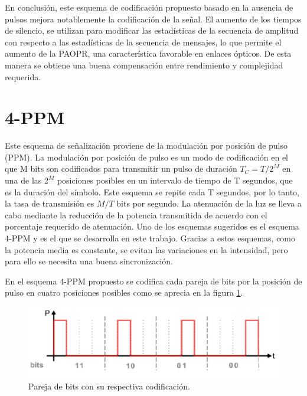 En conclusión, este esquema de codificación propuesto basado en la ausencia de pulsos
mejora notablemente la codificación de la señal.
El aumento de los tiempos de silencio, se utilizan para modificar las estadísticas de
la secuencia de amplitud con respecto a las estadísticas de la
secuencia de mensajes, lo que permite el aumento de la PAOPR,
una característica favorable en enlaces ópticos. De esta manera se 
obtiene una buena compensación entre rendimiento y complejidad requerida.

\section{4-PPM}
Este esquema de señalización 
proviene de la modulación por posición de pulso (PPM).
La modulación por posición de pulso es un modo de codificación en el que M bits son 
codificados para transmitir un pulso de duración $ T_C = T/2^M $ en una de las $ 2^M $ 
posiciones posibles en un intervalo de tiempo de T segundos, que es la duración del símbolo.
Este esquema se repite cada T segundos, por lo tanto, la tasa de transmisión es $M/T$ bits 
por segundo. La
atenuación de la luz se lleva a cabo mediante la reducción de la potencia transmitida de 
acuerdo con el
porcentaje requerido de atenuación.
Uno de los esquemas sugeridos es el esquema 4-PPM y es el que se desarrolla en este trabajo.
Gracias a estos esquemas, como la potencia media es constante, se evitan las variaciones 
en la intensidad, pero para ello se necesita una buena sincronización. \cite{ppm}

En el esquema 4-PPM propuesto se codifica cada pareja de bits
por la posición de pulso en cuatro posiciones posibles como se aprecia en la figura
\ref{bits4ppm}.

\begin{figure}[ht]
    \centering
    \includegraphics[scale=0.4]{./figuras/opciones4PPM.png}%
    \caption{\small{Pareja de bits con su respectiva codificación.}}
    \label{bits4ppm}%
\end{figure}

